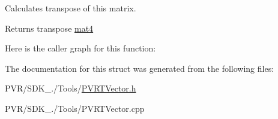 Calculates transpose of this matrix. 





\begin{DoxyReturn}{Returns}
transpose \hyperlink{classmat4}{mat4} 
\end{DoxyReturn}


Here is the caller graph for this function\+:




The documentation for this struct was generated from the following files\+:\begin{DoxyCompactItemize}
\item 
P\+V\+R/\+S\+D\+K\+\_./\+Tools/\hyperlink{_p_v_r_t_vector_8h}{P\+V\+R\+T\+Vector.\+h}\item 
P\+V\+R/\+S\+D\+K\+\_./\+Tools/P\+V\+R\+T\+Vector.\+cpp\end{DoxyCompactItemize}
